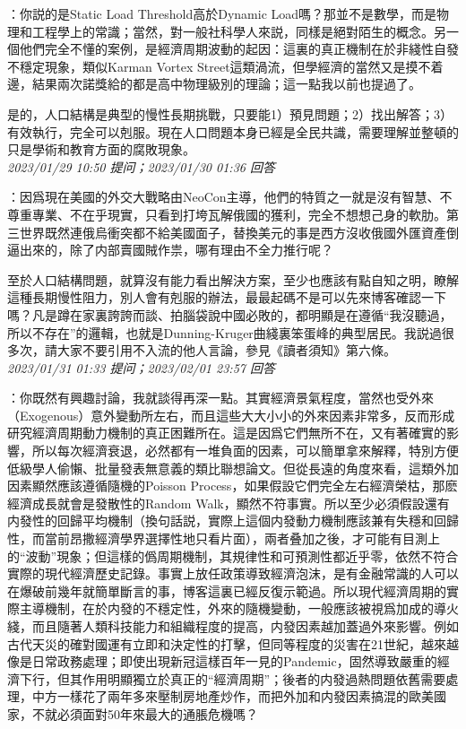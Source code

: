 \documentclass[twocolumn]{ctexart}
\begin{document}
：你説的是Static Load Threshold高於Dynamic Load嗎？那並不是數學，而是物理和工程學上的常識；當然，對一般社科學人來説，同樣是絕對陌生的概念。另一個他們完全不懂的案例，是經濟周期波動的起因：這裏的真正機制在於非綫性自發不穩定現象，類似Karman Vortex Street這類渦流，但學經濟的當然又是摸不着邊，結果兩次諾獎給的都是高中物理級別的理論；這一點我以前也提過了。

是的，人口結構是典型的慢性長期挑戰，只要能1）預見問題；2）找出解答；3）有效執行，完全可以剋服。現在人口問題本身已經是全民共識，需要理解並整頓的只是學術和教育方面的腐敗現象。
\\

\textit{\hfill\noindent\small 2023/01/29 10:50 提问；2023/01/30 01:36 回答}

：因爲現在美國的外交大戰略由NeoCon主導，他們的特質之一就是沒有智慧、不尊重專業、不在乎現實，只看到打垮瓦解俄國的獲利，完全不想想己身的軟肋。第三世界既然連俄烏衝突都不給美國面子，替換美元的事是西方沒收俄國外匯資產倒逼出來的，除了内部賣國賊作祟，哪有理由不全力推行呢？

至於人口結構問題，就算沒有能力看出解決方案，至少也應該有點自知之明，瞭解這種長期慢性阻力，別人會有剋服的辦法，最最起碼不是可以先來博客確認一下嗎？凡是蹲在家裏誇誇而談、拍腦袋說中國必敗的，都明顯是在遵循“我沒聽過，所以不存在”的邏輯，也就是Dunning-Kruger曲綫裏笨蛋峰的典型居民。我説過很多次，請大家不要引用不入流的他人言論，參見《讀者須知》第六條。
\\

\textit{\hfill\noindent\small 2023/01/31 01:33 提问；2023/02/01 23:57 回答}

：你既然有興趣討論，我就談得再深一點。其實經濟景氣程度，當然也受外來（Exogenous）意外變動所左右，而且這些大大小小的外來因素非常多，反而形成研究經濟周期動力機制的真正困難所在。這是因爲它們無所不在，又有著確實的影響，所以每次經濟衰退，必然都有一堆負面的因素，可以簡單拿來解釋，特別方便低級學人偷懶、批量發表無意義的類比聯想論文。但從長遠的角度來看，這類外加因素顯然應該遵循隨機的Poisson Process，如果假設它們完全左右經濟榮枯，那麽經濟成長就會是發散性的Random Walk，顯然不符事實。所以至少必須假設還有内發性的回歸平均機制（換句話説，實際上這個内發動力機制應該兼有失穩和回歸性，而當前昂撒經濟學界選擇性地只看片面），兩者叠加之後，才可能有目測上的“波動”現象；但這樣的僞周期機制，其規律性和可預測性都近乎零，依然不符合實際的現代經濟歷史記錄。事實上放任政策導致經濟泡沫，是有金融常識的人可以在爆破前幾年就簡單斷言的事，博客這裏已經反復示範過。所以現代經濟周期的實際主導機制，在於内發的不穩定性，外來的隨機變動，一般應該被視爲加成的導火綫，而且隨著人類科技能力和組織程度的提高，内發因素越加蓋過外來影響。例如古代天災的確對國運有立即和決定性的打擊，但同等程度的災害在21世紀，越來越像是日常政務處理；即使出現新冠這樣百年一見的Pandemic，固然導致嚴重的經濟下行，但其作用明顯獨立於真正的“經濟周期”；後者的内發過熱問題依舊需要處理，中方一樣花了兩年多來壓制房地產炒作，而把外加和内發因素搞混的歐美國家，不就必須面對50年來最大的通脹危機嗎？
\end{document}
